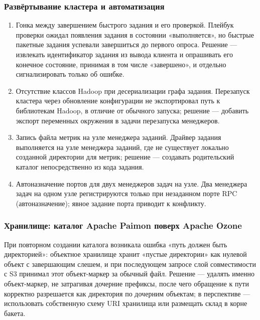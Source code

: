 \subsubsection{Развёртывание кластера и автоматизация}

\begin{enumerate}
    \item Гонка между завершением быстрого задания и его проверкой. Плейбук
        проверки ожидал появления задания в состоянии «выполняется», но быстрые
        пакетные задания успевали завершиться до первого опроса. Решение --- извлекать
        идентификатор задания из вывода клиента и опрашивать его конечное состояние,
        принимая в том числе «завершено», и отдельно сигнализировать только об ошибке.
    \item Отсутствие классов Hadoop при десериализации графа задания.
        Перезапуск кластера через обновление конфигурации не экспортировал путь к
        библиотекам Hadoop, в отличие от обычного запуска; решение --- добавить
        экспорт переменных окружения в задачи перезапуска менеджеров.
    \item Запись файла метрик на узле менеджера заданий. Драйвер задания
        выполняется на узле менеджера заданий, где не существует локально созданной
        директории для метрик; решение --- создавать родительский каталог
        непосредственно из кода задания.
    \item Автоназначение портов для двух менеджеров задач на узле. Два
        менеджера задач на одном узле регистрируются только при незаданном порте RPC
        (автоназначение); явное задание порта приводит к конфликту.
\end{enumerate}

\subsubsection{Хранилище: каталог Apache Paimon поверх Apache Ozone}

При повторном создании каталога возникала ошибка «путь должен быть директорией»:
объектное хранилище хранит «пустые директории» как нулевой объект с завершающим
слешем, и при последующем запросе слой совместимости с S3 принимал этот объект-маркер
за обычный файл. Решение --- удалять именно объект-маркер, не затрагивая дочерние
префиксы, после чего обращение к пути корректно разрешается как директория по
дочерним объектам; в перспективе --- использовать собственную схему URI хранилища или
размещать склад в корне бакета.

